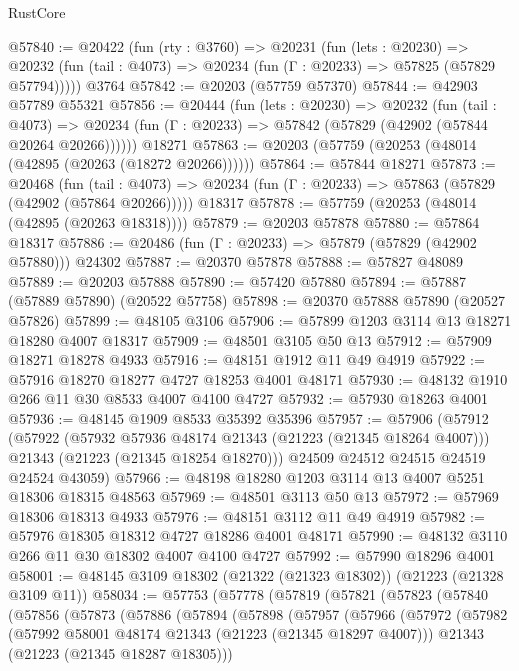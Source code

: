 \begin{lexlean}{RustCore}
\begin{coremodule}
@57840 := @20422
    (fun (rty : @3760) =>
    @20231
      (fun (lets : @20230) =>
      @20232 (fun (tail : @4073) => @20234 (fun (Γ : @20233) => @57825 (@57829 @57794)))))
    @3764
@57842 := @20203 (@57759 @57370)
@57844 := @42903 @57789 @55321
@57856 := @20444
    (fun (lets : @20230) =>
    @20232
      (fun (tail : @4073) =>
      @20234 (fun (Γ : @20233) => @57842 (@57829 (@42902 (@57844 @20264 @20266))))))
    @18271
@57863 := @20203 (@57759 (@20253 (@48014 (@42895 (@20263 (@18272 @20266))))))
@57864 := @57844 @18271
@57873 := @20468
    (fun (tail : @4073) => @20234 (fun (Γ : @20233) => @57863 (@57829 (@42902 (@57864 @20266)))))
    @18317
@57878 := @57759 (@20253 (@48014 (@42895 (@20263 @18318))))
@57879 := @20203 @57878
@57880 := @57864 @18317
@57886 := @20486 (fun (Γ : @20233) => @57879 (@57829 (@42902 @57880))) @24302
@57887 := @20370 @57878
@57888 := @57827 @48089
@57889 := @20203 @57888
@57890 := @57420 @57880
@57894 := @57887 (@57889 @57890) (@20522 @57758)
@57898 := @20370 @57888 @57890 (@20527 @57826)
@57899 := @48105 @3106
@57906 := @57899 @1203 @3114 @13 @18271 @18280 @4007 @18317
@57909 := @48501 @3105 @50 @13
@57912 := @57909 @18271 @18278 @4933
@57916 := @48151 @1912 @11 @49 @4919
@57922 := @57916 @18270 @18277 @4727 @18253 @4001 @48171
@57930 := @48132 @1910 @266 @11 @30 @8533 @4007 @4100 @4727
@57932 := @57930 @18263 @4001
@57936 := @48145 @1909 @8533 @35392 @35396
@57957 := @57906
    (@57912
      (@57922
        (@57932 @57936 @48174 @21343 (@21223 (@21345 @18264 @4007)))
        @21343
        (@21223 (@21345 @18254 @18270)))
      @24509
      @24512
      @24515
      @24519
      @24524
      @43059)
@57966 := @48198 @18280 @1203 @3114 @13 @4007 @5251 @18306 @18315 @48563
@57969 := @48501 @3113 @50 @13
@57972 := @57969 @18306 @18313 @4933
@57976 := @48151 @3112 @11 @49 @4919
@57982 := @57976 @18305 @18312 @4727 @18286 @4001 @48171
@57990 := @48132 @3110 @266 @11 @30 @18302 @4007 @4100 @4727
@57992 := @57990 @18296 @4001
@58001 := @48145 @3109 @18302 (@21322 (@21323 @18302)) (@21223 (@21328 @3109 @11))
@58034 := @57753
    (@57778
      (@57819
        (@57821
          (@57823
            (@57840
              (@57856
                (@57873
                  (@57886
                    (@57894
                      (@57898
                        (@57957
                          (@57966
                            (@57972
                              (@57982
                                (@57992 @58001 @48174 @21343 (@21223 (@21345 @18297 @4007)))
                                @21343
                                (@21223 (@21345 @18287 @18305)))

\end{coremodule}
\end{lexlean}
